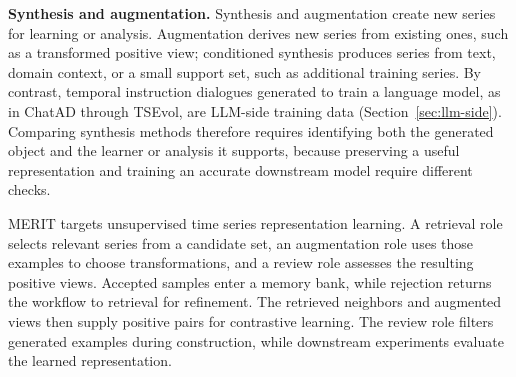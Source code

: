 \documentclass[preprints,article,submit,moreauthors]{Definitions/mdpi}
\begin{document}
\noindent\textbf{Synthesis and augmentation.}\label{sec:task-synthesis} Synthesis and augmentation create new series for learning or analysis. Augmentation derives new series from existing ones, such as a transformed positive view; conditioned synthesis produces series from text, domain context, or a small support set, such as additional training series. By contrast, temporal instruction dialogues generated to train a language model, as in ChatAD \citep{chatad2026} through TSEvol, are LLM-side training data (Section~\ref{sec:llm-side}). Comparing synthesis methods therefore requires identifying both the generated object and the learner or analysis it supports, because preserving a useful representation and training an accurate downstream model require different checks.


MERIT \citep{merit2025} targets unsupervised time series representation learning. A retrieval role selects relevant series from a candidate set, an augmentation role uses those examples to choose transformations, and a review role assesses the resulting positive views. Accepted samples enter a memory bank, while rejection returns the workflow to retrieval for refinement. The retrieved neighbors and augmented views then supply positive pairs for contrastive learning. The review role filters generated examples during construction, while downstream experiments evaluate the learned representation.
\end{document}
